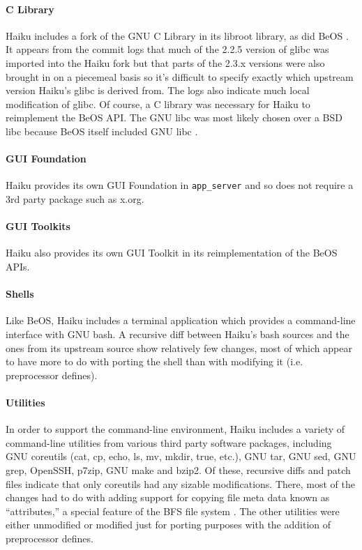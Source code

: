 \documentclass{article}
\begin{document}
\paragraph{C Library}
Haiku includes a fork of the GNU C Library in its libroot library, as
did BeOS \cite{GlibCWiki}.  It appears from the commit logs that much
of the 2.2.5 version of glibc was imported into the Haiku fork
\cite{HaikuLibrootGlibcOld} but that parts of the 2.3.x versions were
also brought in on a piecemeal basis \cite{HaikuLibrootGlibcRecent} so
it's difficult to specify exactly which upstream version Haiku's glibc
is derived from.  The logs also indicate much local modification of
glibc.  Of course, a C library was necessary for Haiku to reimplement
the BeOS API.  The GNU libc was most likely chosen over a BSD libc
because BeOS itself included GNU libc \cite{GlibCWiki}.

\paragraph{GUI Foundation}
Haiku provides its own GUI Foundation in \texttt{app\_server} and so
does not require a 3rd party package such as x.org.

\paragraph{GUI Toolkits}
Haiku also provides its own GUI Toolkit in its reimplementation of the
BeOS APIs.

\paragraph{Shells}
Like BeOS, Haiku includes a terminal application which provides a
command-line interface with GNU bash.  A recursive diff between
Haiku's bash sources and the ones from its upstream source show
relatively few changes, most of which appear to have more to do with
porting the shell than with modifying it (i.e. preprocessor defines).

\paragraph{Utilities}
In order to support the command-line environment, Haiku includes a
variety of command-line utilities from various third party software
packages, including GNU coreutils (cat, cp, echo, ls, mv, mkdir, true,
etc.), GNU tar, GNU sed, GNU grep, OpenSSH, p7zip, GNU make and bzip2.
Of these, recursive diffs and patch files \cite{HaikuR1A3Src} indicate
that only coreutils had any sizable modifications.  There, most of the
changes had to do with adding support for copying file meta data known
as ``attributes,'' a special feature of the BFS file system
\cite{BFSWiki}.  The other utilities were either unmodified or
modified just for porting purposes with the addition of preprocessor
defines.
\end{document}
